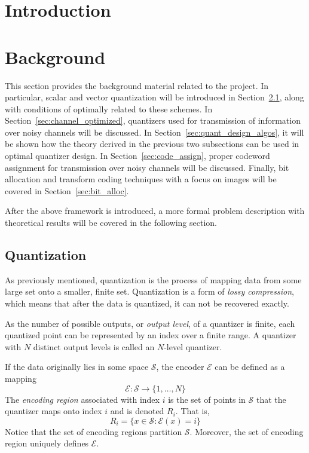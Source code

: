 \documentclass[10pt]{article}
\begin{document}
\section{Introduction}

\section{Background}
This section provides the background material related to the project. In particular, scalar and vector quantization will be introduced in Section~\ref{sec:quantization}, along with conditions of optimally related to these schemes. In Section~\ref{sec:channel_optimized}, quantizers used for transmission of information over noisy channels will be discussed. In Section~\ref{sec:quant_design_algos}, it will be shown how the theory derived in the previous two subsections can be used in optimal quantizer design. In Section~\ref{sec:code_assign}, proper codeword assignment for transmission over noisy channels will be discussed. Finally, bit allocation and transform coding techniques with a focus on images will be covered in Section~\ref{sec:bit_alloc}.

After the above framework is introduced, a more formal problem description with theoretical results will be covered in the following section.

\subsection{Quantization}
\label{sec:quantization}
As previously mentioned, quantization is the process of mapping data from some large set onto a smaller, finite set. Quantization is a form of \emph{lossy compression}, which means that after the data is quantized, it can not be recovered exactly.

As the number of possible outputs, or \emph{output level}, of a quantizer is finite, each quantized point can be represented by an index over a finite range. A quantizer with $N$ distinct output levels is called an $N$-level quantizer. 

If the data originally lies in some space $\mathcal{S}$, the encoder $\mathcal{E}$ can be defined as a mapping
\begin{equation}
\mathcal{E} : \mathcal{S} \rightarrow \{1,\ldots,N\}
\end{equation}
The \emph{encoding region} associated with index $i$ is the set of points in $\mathcal{S}$ that the quantizer maps onto index $i$ and is denoted $R_i$. That is,
\begin{equation}
R_i = \{x \in \mathcal{S} : \mathcal{E}(x) = i\}
\end{equation}
Notice that the set of encoding regions partition $\mathcal{S}$. Moreover, the set of encoding region uniquely defines $\mathcal{E}$.
\end{document}
